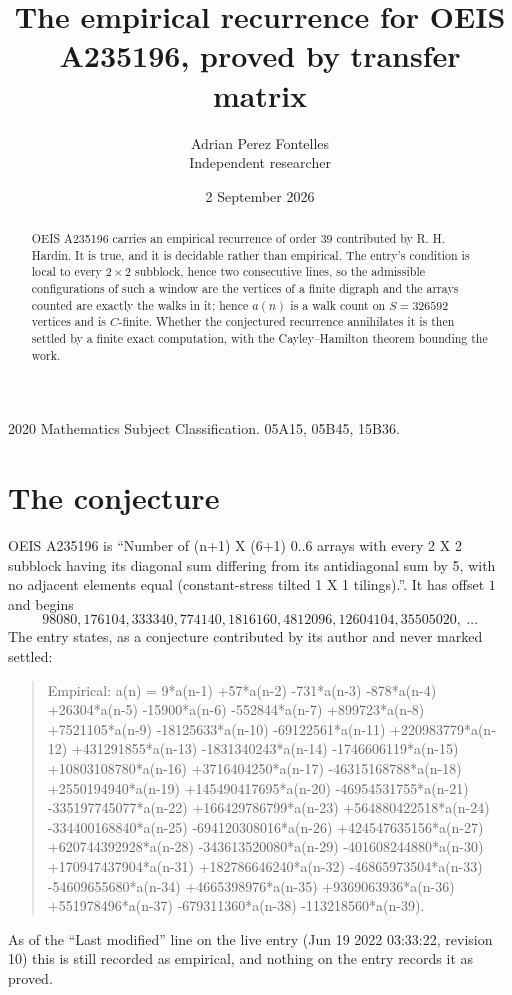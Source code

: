 \documentclass[11pt,a4paper]{article}
\title{The empirical recurrence for OEIS A235196, proved by transfer matrix}
\author{Adrian Perez Fontelles\\ \small Independent researcher}
\date{2 September 2026}
\theoremstyle{plain}
\theoremstyle{definition}
\begin{document}
\maketitle

\begin{abstract}
OEIS A235196 carries an empirical recurrence of order $39$ contributed by R. H. Hardin. It is
true, and it is decidable rather than empirical. The entry's condition is local to every $2\times2$ subblock, hence two consecutive lines, so
the admissible configurations of such a window are the vertices of a finite digraph and the
arrays counted are exactly the walks in it; hence $a(n)$ is a walk count on $S=326592$ vertices
and is $C$-finite. Whether the conjectured recurrence annihilates it is then settled by a
finite exact computation, with the Cayley--Hamilton theorem bounding the work.
\end{abstract}

\noindent\small 2020 Mathematics Subject Classification. 05A15, 05B45, 15B36.\normalsize

\section{The conjecture}

OEIS A235196 is ``Number of (n+1) X (6+1) 0..6 arrays with every 2 X 2 subblock having its diagonal sum differing from its antidiagonal sum by 5, with no adjacent elements equal (constant-stress tilted 1 X 1 tilings).''. It has offset $1$ and begins
\[
98080, 176104, 333340, 774140, 1816160, 4812096, 12604104, 35505020,\ \dots
\]
The entry states, as a conjecture contributed by its author and never marked settled:
\begin{quote}
Empirical: a(n) = 9*a(n-1) +57*a(n-2) -731*a(n-3) -878*a(n-4) +26304*a(n-5) -15900*a(n-6) -552844*a(n-7) +899723*a(n-8) +7521105*a(n-9) -18125633*a(n-10) -69122561*a(n-11) +220983779*a(n-12) +431291855*a(n-13) -1831340243*a(n-14) -1746606119*a(n-15) +10803108780*a(n-16) +3716404250*a(n-17) -46315168788*a(n-18) +2550194940*a(n-19) +145490417695*a(n-20) -46954531755*a(n-21) -335197745077*a(n-22) +166429786799*a(n-23) +564880422518*a(n-24) -334400168840*a(n-25) -694120308016*a(n-26) +424547635156*a(n-27) +620744392928*a(n-28) -343613520080*a(n-29) -401608244880*a(n-30) +170947437904*a(n-31) +182786646240*a(n-32) -46865973504*a(n-33) -54609655680*a(n-34) +4665398976*a(n-35) +9369063936*a(n-36) +551978496*a(n-37) -679311360*a(n-38) -113218560*a(n-39).
\end{quote}
As of the ``Last modified'' line on the live entry (Jun 19 2022 03:33:22, revision 10) this is still
recorded as empirical, and nothing on the entry records it as proved.
\end{document}
